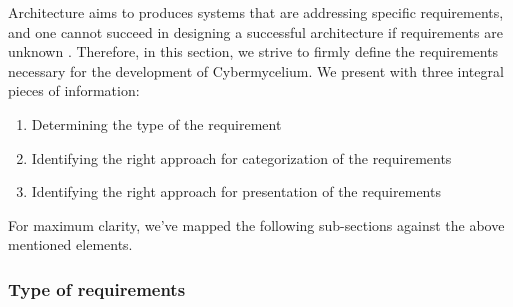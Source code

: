 \documentclass[review]{elsarticle}
\begin{document}
Architecture aims to produces systems that are addressing specific requirements, and one cannot succeed in designing a successful architecture if requirements are unknown \cite{SoftwareArchitectureKazman}. Therefore, in this section, we strive to firmly define the requirements necessary for the development of Cybermycelium. We present with three integral pieces of information: 

\begin{enumerate}
    \item Determining the type of the requirement 
    \item Identifying the right approach for categorization of the requirements 
    \item Identifying the right approach for presentation of the requirements 
\end{enumerate}

For maximum clarity, we've mapped the following sub-sections against the above mentioned elements. 



\subsubsection{Type of requirements}
\end{document}
